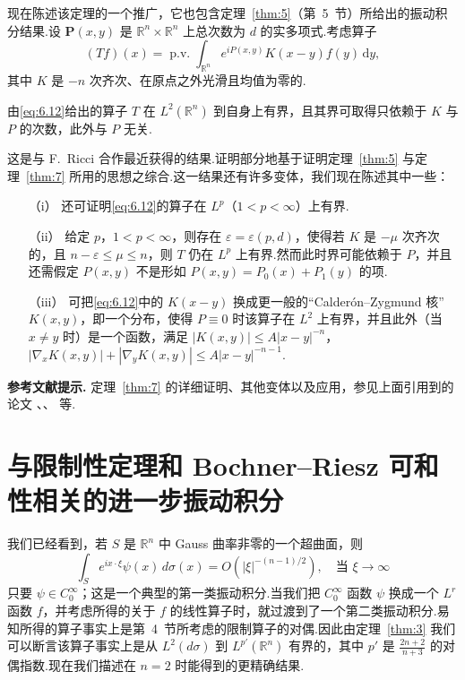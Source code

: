 \documentclass[
  BookTitleCN={傅里叶分析中的振动积分},
  BookTitleEN={Oscillatory Integrals in Fourier Analysis},
  OriginalAuthor={E.~M. Stein},
  OriginalEdition={Proc. Sympos. Pure Math. 35, Part~1},
  OriginalPublisher={American Mathematical Society},
  OriginalYear={1979},
  Translator={翻译及重排},
  ModelUsed={Codex CLI},
  Biblatex=false,
  TranslationDate={2026年8月27日}
]{mathtranslation}
\numberwithin{equation}{chapter}   %
\newcommand{\R}{\mathbb{R}}
\begin{document}
\noindent 现在陈述该定理的一个推广，它也包含定理~\ref{thm:5}（第~5~节）所给出的振动积分结果.设 $\mathbf{P}(x,y)$ 是 $\R^{n}\times\R^{n}$ 上总次数为 $d$ 的实多项式.考虑算子
\begin{equation}
  (Tf)(x)=\operatorname{p.v.}\int_{\R^{n}}e^{iP(x,y)}K(x-y)f(y)\,\mathrm{d}y, \label{eq:6.12}
\end{equation}
其中 $K$ 是 $-n$ 次齐次、在原点之外光滑且均值为零的.

\begin{theorem}\label{thm:8}
  由\eqref{eq:6.12}给出的算子 $T$ 在 $L^{2}(\R^{n})$ 到自身上有界，且其界可取得只依赖于 $K$ 与 $P$ 的次数，此外与 $P$ 无关.
\end{theorem}

\noindent 这是与 F.~Ricci 合作最近获得的结果.证明部分地基于证明定理~\ref{thm:5} 与定理~\ref{thm:7} 所用的思想之综合.这一结果还有许多变体，我们现在陈述其中一些：
\begin{enumerate}
  \item[（i）] 还可证明\eqref{eq:6.12}的算子在 $L^{p}$（$1<p<\infty$）上有界.
  \item[（ii）] 给定 $p$，$1<p<\infty$，则存在 $\varepsilon=\varepsilon(p,d)$，使得若 $K$ 是 $-\mu$ 次齐次的，且 $n-\varepsilon\leq\mu\leq n$，则 $T$ 仍在 $L^{p}$ 上有界.然而此时界可能依赖于 $P$，并且还需假定 $P(x,y)$ 不是形如 $P(x,y)=P_{0}(x)+P_{1}(y)$ 的项.
  \item[（iii）] 可把\eqref{eq:6.12}中的 $K(x-y)$ 换成更一般的``Calder\'on--Zygmund 核''$K(x,y)$，即一个分布，使得 $P\equiv0$ 时该算子在 $L^{2}$ 上有界，并且此外（当 $x\neq y$ 时）是一个函数，满足 $|K(x,y)|\leq A|x-y|^{-n}$，$|\nabla_{x}K(x,y)|+|\nabla_{y}K(x,y)|\leq A|x-y|^{-n-1}$.
\end{enumerate}

\noindent\textbf{参考文献提示.} 定理~\ref{thm:7} 的详细证明、其他变体以及应用，参见上面引用到的论文 \cite{ref19}、\cite{ref22}、\cite{ref23} 等.

\chapter{与限制性定理和 Bochner--Riesz 可和性相关的进一步振动积分}

\noindent 我们已经看到，若 $S$ 是 $\R^{n}$ 中 Gauss 曲率非零的一个超曲面，则
\[
  \int_{S}e^{ix\cdot\xi}\psi(x)\,d\sigma(x)=O(|\xi|^{-(n-1)/2}),\quad\text{当 }\xi\to\infty
\]
只要 $\psi\in C_0^\infty$；这是一个典型的第一类振动积分.当我们把 $C_0^\infty$ 函数 $\psi$ 换成一个 $L^{r}$ 函数 $f$，并考虑所得的关于 $f$ 的线性算子时，就过渡到了一个第二类振动积分.易知所得的算子事实上是第~4~节所考虑的限制算子的对偶.因此由定理~\ref{thm:3} 我们可以断言该算子事实上是从 $L^{2}(d\sigma)$ 到 $L^{p'}(\R^{n})$ 有界的，其中 $p'$ 是 $\frac{2n+2}{n+3}$ 的对偶指数.现在我们描述在 $n=2$ 时能得到的更精确结果.
\end{document}

